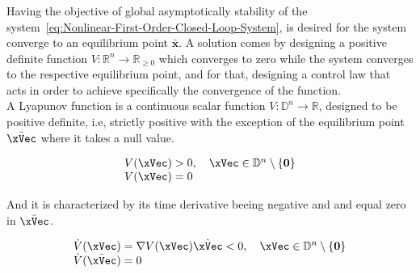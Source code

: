 \subsubsection{}
\label{subsub:control_lyapunov_function}

Having the objective of global asymptotically stability of the system~\eqref{eq:Nonlinear-First-Order-Closed-Loop-System}, is desired for the system converge to an equilibrium point \( \bar{\mathbf{x}} \). A solution comes by designing a positive definite function \( V: \mathbb{R}^n \rightarrow \mathbb{R}_{\geq 0} \) which converges to zero while the system converges to the respective equilibrium point, and for that, designing a control law that acts in order to achieve specifically the convergence of the function. \\

A Lyapunov function is a continuous scalar function \(V:\mathbb{D}^n \to \mathbb{R}\), designed to be positive definite, i.e, strictly positive with the exception of the equilibrium point \(\bar{\xVec}\) where it takes a null value.  

\begin{equation}
    \begin{array}{l}
    V(\mathbf{\xVec}) > 0, \quad \xVec \in \mathbb{D}^n\setminus \{\mathbf{0}\} \\
    V(\mathbf{\xVec}) = 0
    \end{array}
    \label{eq:LF_condition}
\end{equation}

And it is characterized by its time derivative beeing negative and and equal zero in \(\bar{\xVec}\).  

\begin{equation}
    \begin{array}{l}
        \dot{V}(\xVec) = \nabla V(\xVec)\dot{\xVec} < 0, \quad \xVec \in \mathbb{D}^n\setminus \{\mathbf{0}\} \\
        \dot{V}(\bar{\xVec}) = 0
    \end{array}
    \label{eq:LF_derivative_condition}
\end{equation}

